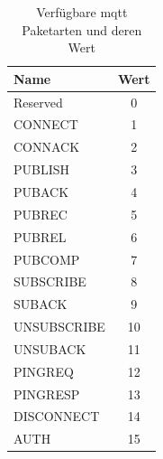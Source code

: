 \begin{table}[h!]
\centering
\renewcommand{\arraystretch}{1.5}
\begin{tabular}{|l|c|}
    \hline
    \textbf{Name} & \textbf{Wert} \\
    \hline
    \hline
    Reserved & 0 \\
    \hline
    CONNECT & 1 \\
    \hline
    CONNACK & 2 \\
    \hline
    PUBLISH & 3 \\
    \hline
    PUBACK & 4 \\
    \hline
    PUBREC & 5 \\
    \hline
    PUBREL & 6 \\
    \hline
    PUBCOMP & 7 \\
    \hline
    SUBSCRIBE & 8 \\
    \hline
    SUBACK & 9 \\
    \hline
    UNSUBSCRIBE & 10 \\
    \hline
    UNSUBACK & 11 \\
    \hline
    PINGREQ & 12 \\
    \hline
    PINGRESP & 13 \\
    \hline
    DISCONNECT & 14 \\
    \hline
    AUTH & 15 \\
    \hline
\end{tabular}
\caption{Verfügbare \ac{mqtt} Paketarten und deren Wert}
\label{table:mqtt-packet-types}
\end{table}

